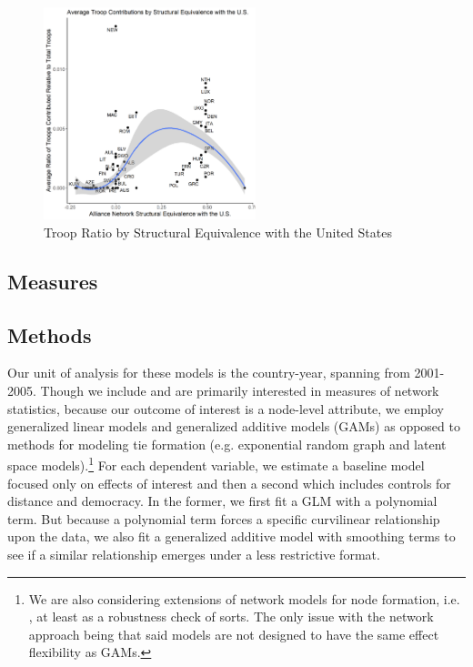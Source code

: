 \documentclass[12pt,letterpaper]{article}
\begin{document}
			\begin{figure}[H]
			\centering
				\includegraphics[width=0.55\textwidth]{figures/contributions.png}
			\caption{Troop Ratio by Structural Equivalence with the United States}
			\label{fig:contr_sequiv}
			\end{figure}

	\subsection{Measures}
		

	\subsection{Methods}
		Our unit of analysis for these models is the country-year, spanning from 2001-2005. Though we include and are primarily interested in measures of network statistics, because our outcome of interest is a node-level attribute, we employ generalized linear models and generalized additive models (GAMs) as opposed to methods for modeling tie formation (e.g. exponential random graph and latent space models).\footnote{We are also considering extensions of network models for node formation, i.e. \citet{fosdick_testingmodelingdependencies_2015}, at least as a robustness check of sorts. The only issue with the network approach being that said models are not designed to have the same effect flexibility as GAMs.} For each dependent variable, we estimate a baseline model focused only on effects of interest and then a second which includes controls for distance and democracy. In the former, we first fit a GLM with a polynomial term. But because a polynomial term forces a specific curvilinear relationship upon the data, we also fit a generalized additive model with smoothing terms to see if a similar relationship emerges under a less restrictive format.
\end{document}
